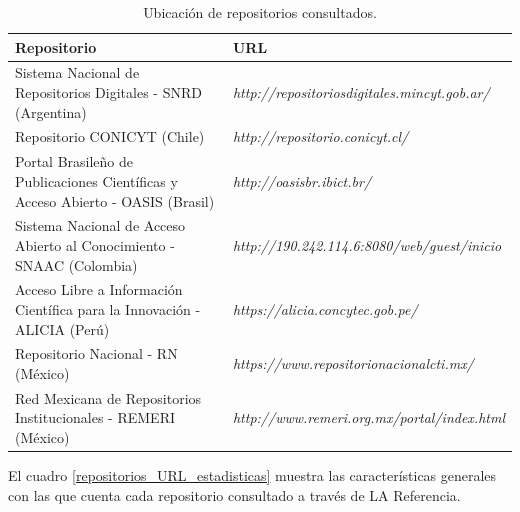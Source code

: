 \begin{table}[htbp]
    \begin{center}
    \begin{tabular}{| p{6.0cm}| p{8.0cm} |}
    \hline
    \centering \textbf{Repositorio} & \textbf{URL} \\
    \hline \hline
    Sistema Nacional de Repositorios Digitales - SNRD (Argentina) & \textit{http://repositoriosdigitales.mincyt.gob.ar/} \\ \hline
    Repositorio CONICYT (Chile) & \textit{http://repositorio.conicyt.cl/} \\ \hline
    Portal Brasileño de Publicaciones Científicas y Acceso Abierto - OASIS (Brasil) & \textit{http://oasisbr.ibict.br/} \\ \hline
    Sistema Nacional de Acceso Abierto al Conocimiento - SNAAC (Colombia) & \textit{http://190.242.114.6:8080/web/guest/inicio} \\ \hline
    Acceso Libre a Información Científica para la Innovación - ALICIA
(Perú) & \textit{https://alicia.concytec.gob.pe/} \\ \hline
    Repositorio Nacional - RN (México) & \textit{https://www.repositorionacionalcti.mx/} \\ \hline
    Red Mexicana de Repositorios Institucionales - REMERI (México) & \textit{http://www.remeri.org.mx/portal/index.html} \\ \hline
    \end{tabular}
    \caption{Ubicación de repositorios consultados.}
    \label{repositorios_URL}
    \end{center}
\end{table}

El cuadro \ref{repositorios_URL_estadisticas} muestra las características generales con las que cuenta cada repositorio consultado a través de LA Referencia.\newline

